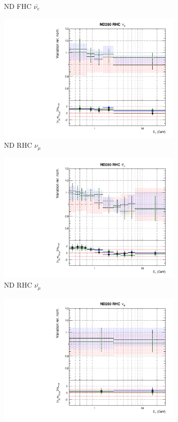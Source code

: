 \begin{figure}
\begin{subfigure}{0.45\textwidth}
  \caption{ND FHC $\bar{\nu_{e}}$}
\end{subfigure}
\begin{subfigure}{0.45\textwidth}
  \centering
  \includegraphics[width=0.75\linewidth]{figs/newolddatafitsflux_4}
  \caption{ND RHC $\nu_{\mu}$}
\end{subfigure}
\begin{subfigure}{0.45\textwidth}
  \centering
  \includegraphics[width=0.75\linewidth]{figs/newolddatafitsflux_5}
  \caption{ND RHC $\bar{\nu_{\mu}}$}
\end{subfigure}
\begin{subfigure}{0.45\textwidth}
  \centering
  \includegraphics[width=0.75\linewidth]{figs/newolddatafitsflux_6}

\end{subfigure}
\end{figure}
